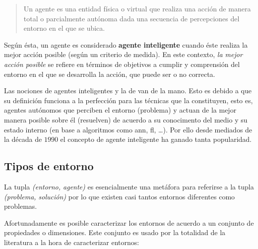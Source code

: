 \blockquote{Un agente es una entidad física o virtual que realiza una acción de manera total o parcialmente autónoma dada una secuencia de percepciones del entorno en el que se ubica.}

Según ésta, un agente es considerado \textbf{agente inteligente} cuando éste realiza la mejor acción posible (según un criterio de medida). En este contexto, \textit{la mejor acción posible} se refiere en términos de objetivos a cumplir y comprensión del entorno en el que se desarrolla la acción, que puede ser o no correcta.

Las nociones de agentes inteligentes y la de  van de la mano. Esto es debido a que su definición funciona a la perfección para las técnicas que la constituyen, esto es, agentes autónomos que perciben el entorno (problema) y actuan de la mejor manera posible sobre él (resuelven) de acuerdo a su conocimento del medio y su estado interno (en base a algoritmos como \acrlong{ann}, \acrlong{fl}, \ldots). Por ello desde mediados de la década de $1990$ el concepto de agente inteligente ha ganado tanta popularidad.

\subsection{Tipos de entorno}

La tupla \textit{(entorno, agente)} es esencialmente una metáfora para referirse a la tupla \textit{(problema, solución)} por lo que existen casi tantos entornos diferentes como problemas.

Afortunadamente es posible caracterizar los entornos de acuerdo a un conjunto de propiedades o dimensiones. Este conjunto es usado por la totalidad de la literatura a la hora de caracterizar entornos:

